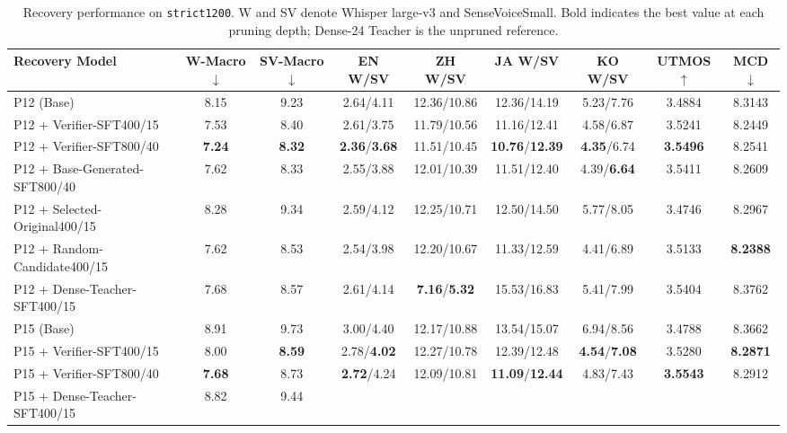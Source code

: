 \documentclass{article}
\begin{document}
\begin{table}[!t]
\centering
\caption{Recovery performance on \texttt{strict1200}.
W and SV denote Whisper large-v3 and SenseVoiceSmall.
Bold indicates the best value at each pruning depth;
Dense-24 Teacher is the unpruned reference.}
\label{tab:recovery_results}
\small
\setlength{\tabcolsep}{3pt}
\renewcommand{\arraystretch}{1.05}
\begin{tabular}{lcccccccc}
\toprule
\textbf{Recovery Model} & \textbf{W-Macro$\downarrow$} &
\textbf{SV-Macro$\downarrow$} &
\textbf{EN W/SV} & \textbf{ZH W/SV} & \textbf{JA W/SV} &
\textbf{KO W/SV} & \textbf{UTMOS$\uparrow$} & \textbf{MCD$\downarrow$} \\
\midrule
P12 (Base) & 8.15 & 9.23 &
2.64/4.11 & 12.36/10.86 & 12.36/14.19 & 5.23/7.76 & 3.4884 & 8.3143 \\
P12 + Verifier-SFT400/15 & 7.53 & 8.40 &
2.61/3.75 & 11.79/10.56 & 11.16/12.41 & 4.58/6.87 & 3.5241 & 8.2449 \\
P12 + Verifier-SFT800/40 & \textbf{7.24} & \textbf{8.32} &
\textbf{2.36}/\textbf{3.68} & 11.51/10.45 & \textbf{10.76}/\textbf{12.39} & \textbf{4.35}/6.74 & \textbf{3.5496} & 8.2541 \\
P12 + Base-Generated-SFT800/40 & 7.62 & 8.33 &
2.55/3.88 & 12.01/10.39 & 11.51/12.40 & 4.39/\textbf{6.64} & 3.5411 & 8.2609 \\
P12 + Selected-Original400/15 & 8.28 & 9.34 &
2.59/4.12 & 12.25/10.71 & 12.50/14.50 & 5.77/8.05 & 3.4746 & 8.2967 \\
P12 + Random-Candidate400/15 & 7.62 & 8.53 &
2.54/3.98 & 12.20/10.67 & 11.33/12.59 & 4.41/6.89 & 3.5133 & \textbf{8.2388} \\
P12 + Dense-Teacher-SFT400/15 & 7.68 & 8.57 &
2.61/4.14 & \textbf{7.16}/\textbf{5.32} & 15.53/16.83 & 5.41/7.99 & 3.5404 & 8.3762 \\
\addlinespace
P15 (Base) & 8.91 & 9.73 &
3.00/4.40 & 12.17/10.88 & 13.54/15.07 & 6.94/8.56 & 3.4788 & 8.3662 \\
P15 + Verifier-SFT400/15 & 8.00 & \textbf{8.59} &
2.78/\textbf{4.02} & 12.27/10.78 & 12.39/12.48 & \textbf{4.54}/\textbf{7.08} & 3.5280 & \textbf{8.2871} \\
P15 + Verifier-SFT800/40 & \textbf{7.68} & 8.73 &
\textbf{2.72}/4.24 & 12.09/10.81 & \textbf{11.09}/\textbf{12.44} & 4.83/7.43 & \textbf{3.5543} & 8.2912 \\
P15 + Dense-Teacher-SFT400/15 & 8.82 & 9.44 &

\end{tabular}
\end{table}
\end{document}
